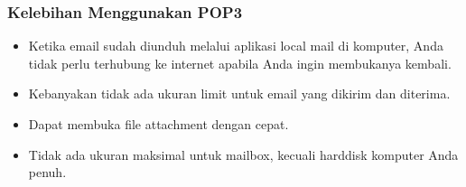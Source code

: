 \subsubsection {Kelebihan Menggunakan POP3}
	\begin{itemize}
		\item Ketika email sudah diunduh melalui aplikasi local mail di komputer, Anda tidak perlu terhubung ke internet apabila Anda ingin membukanya kembali. 
		\item Kebanyakan tidak ada ukuran limit untuk email yang dikirim dan diterima. 
		\item Dapat membuka ﬁle attachment dengan cepat.
		\item Tidak ada ukuran maksimal untuk mailbox, kecuali harddisk komputer Anda penuh.
	\end{itemize}
	

